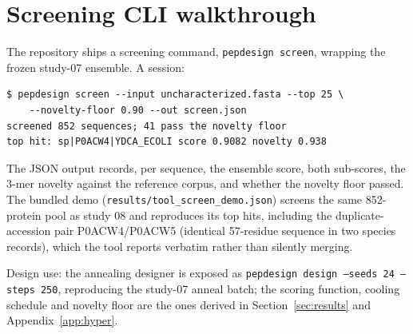
\section{Screening CLI walkthrough}\label{app:cli}
The repository ships a screening command, \texttt{pepdesign screen},
wrapping the frozen study-07 ensemble. A session:

\begin{verbatim}
$ pepdesign screen --input uncharacterized.fasta --top 25 \
    --novelty-floor 0.90 --out screen.json
screened 852 sequences; 41 pass the novelty floor
top hit: sp|P0ACW4|YDCA_ECOLI score 0.9082 novelty 0.938
\end{verbatim}

The JSON output records, per sequence, the ensemble score, both sub-scores,
the 3-mer novelty against the reference corpus, and whether the novelty
floor passed. The bundled demo (\texttt{results/tool\_screen\_demo.json})
screens the same 852-protein pool as study 08 and reproduces its top hits,
including the duplicate-accession pair P0ACW4/P0ACW5 (identical 57-residue
sequence in two species records), which the tool reports verbatim rather
than silently merging.

Design use: the annealing designer is exposed as
\texttt{pepdesign design --seeds 24 --steps 250}, reproducing the study-07
anneal batch; the scoring function, cooling schedule and novelty floor are
the ones derived in Section~\ref{sec:results} and Appendix~\ref{app:hyper}.
